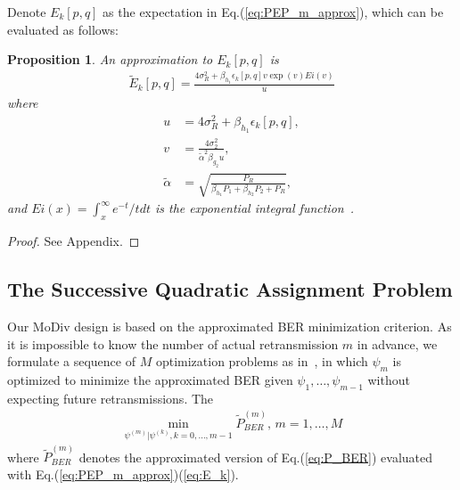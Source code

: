 \documentclass{article}
\newtheorem{proposition}{Proposition}
\begin{document}
Denote $E_k[p,q]$ as the expectation in Eq.(\ref{eq:PEP_m_approx}), which can be
evaluated as follows:
\begin{proposition}
  An approximation to $E_k[p,q]$ is
  \begin{align}
    \tilde{E}_k[p,q] = \frac{4\sigma_R^2
    + \beta_{h_1}\epsilon_k[p,q]v\exp(v)Ei(v)}{u}
    \label{eq:E_k}
  \end{align}
  where
  \begin{subequations}
    \begin{align}
      u & = 4\sigma_R^2 + \beta_{h_1}\epsilon_k[p,q],\\
      v & =
      \frac{4\sigma_2^2}{\tilde{\alpha}^2\beta_{g_2}u}, \\
      \tilde{\alpha} & = \sqrt{\frac{P_R}{\beta_{h_1}P_1 + \beta_{h_2}P_2+P_R}},
    \end{align}
  \end{subequations}
  and $Ei(x) = \int_x^\infty e^{-t}/tdt$ is the exponential integral
  function~\cite{zwillinger2014table}. 
  \label{prop:E_k}
\end{proposition}
\begin{proof}
  See Appendix.
\end{proof}

\subsection{The Successive Quadratic Assignment Problem}
\label{ssec:qap}
Our MoDiv design is based on the approximated BER minimization criterion. As it
is impossible to know the number of actual retransmission $m$ in advance, we
formulate a sequence of $M$ optimization problems as
in~\cite{harvind2005symbol}, in which $\psi_m$ is optimized to minimize the
approximated BER given $\psi_1,\ldots,\psi_{m-1}$ without expecting future retransmissions. The
\begin{align}
  \min_{\psi^{(m)}|\psi^{(k)},k=0,\ldots,m-1}\tilde{P}_{BER}^{(m)},\,m=1,\ldots,M
  \label{eq:core}
\end{align}
where $\tilde{P}_{BER}^{(m)}$ denotes the approximated version of
Eq.(\ref{eq:P_BER}) evaluated with Eq.(\ref{eq:PEP_m_approx})(\ref{eq:E_k}).
\end{document}

